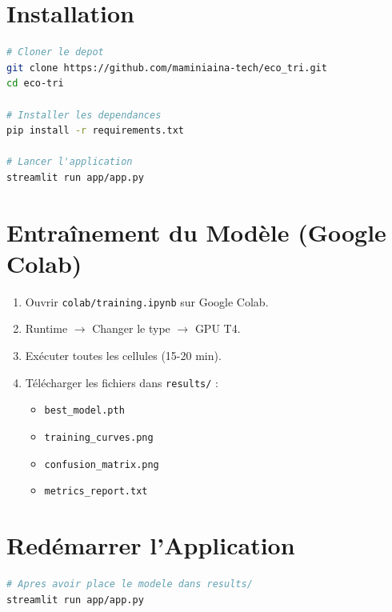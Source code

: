 \documentclass[12pt,a4paper]{report}
\begin{document}
\section{Installation}
\begin{lstlisting}[language=bash, caption={Commandes d'installation}]
# Cloner le depot
git clone https://github.com/maminiaina-tech/eco_tri.git
cd eco-tri

# Installer les dependances
pip install -r requirements.txt

# Lancer l'application
streamlit run app/app.py
\end{lstlisting}

\section{Entraînement du Modèle (Google Colab)}
\begin{enumerate}
    \item Ouvrir \texttt{colab/training.ipynb} sur Google Colab.
    \item Runtime $\rightarrow$ Changer le type $\rightarrow$ GPU T4.
    \item Exécuter toutes les cellules (15-20 min).
    \item Télécharger les fichiers dans \texttt{results/} :
    \begin{itemize}
        \item \texttt{best\_model.pth}
        \item \texttt{training\_curves.png}
        \item \texttt{confusion\_matrix.png}
        \item \texttt{metrics\_report.txt}
    \end{itemize}
\end{enumerate}

\section{Redémarrer l'Application}
\begin{lstlisting}[language=bash]
# Apres avoir place le modele dans results/
streamlit run app/app.py
\end{lstlisting}
\end{document}
